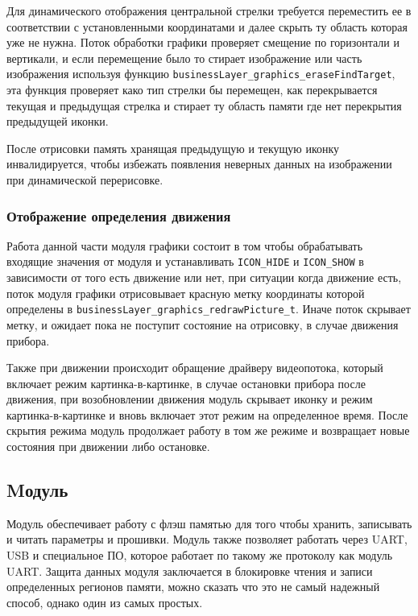 Для динамического отображения центральной стрелки требуется переместить ее в соответствии с установленными координатами и далее скрыть ту область которая уже не нужна.
Поток обработки графики проверяет смещение по горизонтали и вертикали, и если перемещение было то стирает изображение или часть изображения используя функцию
\lstinline{businessLayer_graphics_eraseFindTarget}, эта функция проверяет како тип стрелки бы перемещен, как перекрывается текущая и предыдущая стрелка и стирает
ту область памяти где нет перекрытия предыдущей иконки. 

После отрисовки память хранящая предыдущую и текущую иконку инвалидируется, чтобы избежать появления неверных данных на изображении при динамической перерисовке. 

\subsubsection{Отображение определения движения}

Работа данной части модуля графики состоит в том чтобы обрабатывать входящие значения от модуля \moduleMoveDetect и устанавливать \lstinline{ICON_HIDE} и \lstinline{ICON_SHOW}
в зависимости от того есть движение или нет, при ситуации когда движение есть, поток модуля графики отрисовывает красную метку координаты которой определены в \lstinline{businessLayer_graphics_redrawPicture_t}.
Иначе поток скрывает метку, и ожидает пока не поступит состояние на отрисовку, в случае движения прибора. 

Также при движении происходит обращение драйверу видеопотока,
который включает режим картинка-в-картинке, в случае остановки прибора после движения, при возобновлении движения модуль скрывает иконку и режим картинка-в-картинке и вновь включает
этот режим на определенное время. 
После скрытия режима модуль продолжает работу в том же режиме и возвращает новые состояния при движении либо остановке.

\subsection{Mодуль \moduleFlashMemory}

Модуль обеспечивает работу с флэш памятью для того чтобы хранить, записывать и читать параметры и прошивки. Модуль также позволяет работать через UART, USB и специальное 
ПО, которое работает по такому же протоколу как модуль UART. Защита данных модуля заключается в блокировке чтения и записи определенных регионов памяти, можно сказать что это
не самый надежный способ, однако один из самых простых. 

